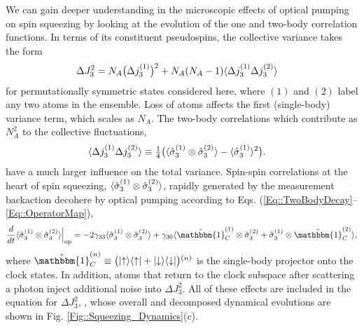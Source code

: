 \documentclass[preprint, aps,pra,onecolumn]{revtex4-1} %
\newcommand{\varz}{\Delta J_3^2}
\begin{document}
We can gain deeper understanding in the microscopic effects of optical pumping on spin squeezing by looking at the evolution of the one and two-body correlation functions.  In terms of its constituent pseudospins, the collective variance takes the form
	\begin{align} \label{Eq::VarianceDecomposition}
	\varz & = N_A \big( \Delta j_3^{(1)} \big)^2 + N_A(N_A-1) \expt{ \Delta j_3^{(1)} \Delta j_3^{(2)} }
	\end{align}
for permutationally symmetric states considered here, where $(1)$ and $(2)$ label any two atoms in the ensemble. Loss of atoms affects the first (single-body) variance term, which scales as $N_A$.
The two-body correlations which contribute as $N_A^2$ to the collective fluctuations, 
	\begin{align}
		\langle{ \Delta j_3^{(1)} \Delta j_3^{(2)} }\rangle &\equiv \mbox{$\frac{1}{4}$} \big( \langle{ \hat{\sigma}_3^{(1)} \otimes \hat{\sigma}_3^{(2)}  }\rangle - \langle{\hat{\sigma}_3^{(1)} }\rangle^2  \big).
\end{align}
have a much larger influence on the total variance. Spin-spin correlations at the heart of spin squeezing, $\langle{ \hat{\sigma}_3^{(1)} \otimes \hat{\sigma}_3^{(2)} }\rangle$, rapidly generated by the measurement backaction decohere by optical pumping according to Eqs. (\ref{Eq::TwoBodyDecay}--\ref{Eq::OperatorMap}),
	\begin{align} \label{Eq::TwoBodySpinDecay}
		\frac{d}{dt} \expt{\hat{\sigma}_3^{(1)} \otimes \hat{\sigma}_3^{(2)} }  \Big|_{\rm op} = - 2 \gamma_{33}  \expt{\hat{\sigma}_3^{(1)} \otimes \hat{\sigma}_3^{(2)}} + \gamma_{30} \expt{ \hat{\mathbbm{1}}^{(1)}_C \otimes \hat{\sigma}_3^{(2)} + \hat{\sigma}_3^{(1)} \otimes \hat{\mathbbm{1}}^{(2)}_C },
	\end{align}
where $\hat{\mathbbm{1}}^{(n)}_C \equiv \big( \op{\uparrow}{\uparrow} + \op{\downarrow}{\downarrow} \big){}^{(n)}$ is the single-body projector onto the clock states.   
In addition, atoms that return to the clock subspace after scattering a photon inject additional noise into $\varz$.  
All of these effects are included in the equation for $\varz$, , whose overall and decomposed dynamical evolutions are shown in Fig. \ref{Fig::Squeezing_Dynamics}(c). 
\end{document}
